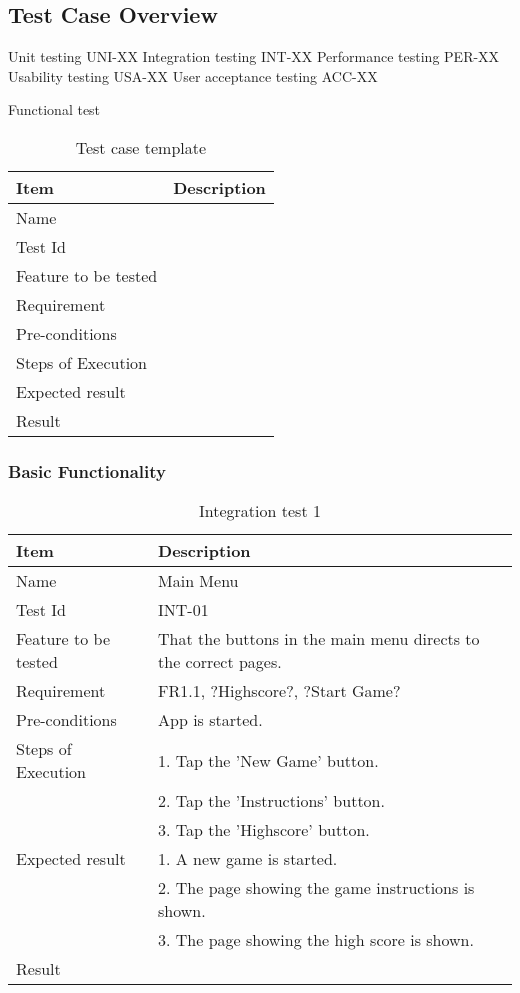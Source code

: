 
\subsection{Test Case Overview}

Unit testing UNI-XX
Integration testing INT-XX
Performance testing PER-XX
Usability testing USA-XX
User acceptance testing ACC-XX

Functional test

\begin{table}[H]
\centering
	\begin{tabular}{ l | l }
		\hline
		{\bf Item} & {\bf Description} \\ \hline
		Name & \\ 
		Test Id & \\ 
		Feature to be tested & \\ 
		Requirement & \\ 
		Pre-conditions & \\ 
		Steps of Execution & \\ 
		Expected result & \\ 
		Result & \\ 
	\end{tabular}
	\caption{Test case template}
\end{table}

\subsubsection{Basic Functionality}

\begin{table}[H]
\centering
	\begin{tabular}{ l | p{8cm} }
		\hline
		{\bf Item} & {\bf Description} \\ \hline
		Name & Main Menu \\ 
		Test Id & INT-01 \\ 
		Feature to be tested & That the buttons in the main menu directs to the correct pages. \\ 
		Requirement & FR1.1, ?Highscore?, ?Start Game? \\ 
		Pre-conditions & App is started. \\ 
		Steps of Execution & 1. Tap the 'New Game' button. \\
		& 2. Tap the 'Instructions' button. \\
		& 3. Tap the 'Highscore' button. \\
		Expected result & 1. A new game is started. \\
		& 2. The page showing the game instructions is shown. \\
		& 3. The page showing the high score is shown. \\
		Result & \\
	\end{tabular}
	\caption{Integration test 1}
\end{table}

